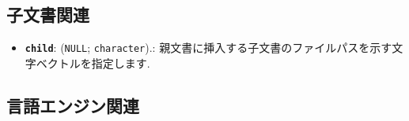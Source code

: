 \documentclass[
  xelatex,ja=standard,jafont=noto]{bxjsreport}
\providecommand{\tightlist}{%
  \setlength{\itemsep}{0pt}\setlength{\parskip}{0pt}}
\begin{document}
\hypertarget{child-document}{%
\subsection{子文書関連}\label{child-document}}

\begin{itemize}
\tightlist
\item
  \textbf{\texttt{child}}: (\texttt{NULL}; \texttt{character}).:
  親文書に挿入する子文書のファイルパスを示す文字ベクトルを指定します.
\end{itemize}

\hypertarget{engine}{%
\subsection{言語エンジン関連}\label{engine}}
\end{document}
